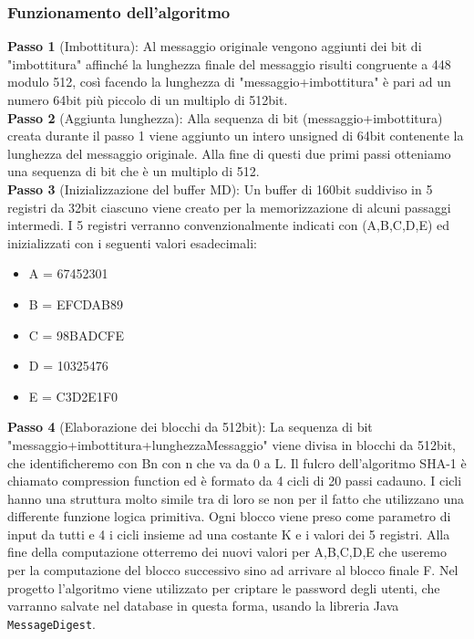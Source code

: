 \documentclass[12pt,a4]{article}
\begin{document}
\subsubsection{Funzionamento dell'algoritmo}

\textbf{Passo 1} (Imbottitura): Al messaggio originale vengono aggiunti dei bit di "imbottitura" affinché la lunghezza finale del messaggio risulti congruente a 448 modulo 512, così facendo la lunghezza di "messaggio+imbottitura" è pari ad un numero 64bit più piccolo di un multiplo di 512bit.\\
\textbf{Passo 2} (Aggiunta lunghezza): Alla sequenza di bit (messaggio+imbottitura) creata durante il passo 1 viene aggiunto un intero unsigned di 64bit contenente la lunghezza del messaggio originale. Alla fine di questi due primi passi otteniamo una sequenza di bit che è un multiplo di 512.\\
\textbf{Passo 3} (Inizializzazione del buffer MD): Un buffer di 160bit suddiviso in 5 registri da 32bit ciascuno viene creato per la memorizzazione di alcuni passaggi intermedi. I 5 registri verranno convenzionalmente indicati con (A,B,C,D,E) ed inizializzati con i seguenti valori esadecimali:
\begin{itemize}

\item A = 67452301
\item B = EFCDAB89
\item C = 98BADCFE
\item D = 10325476
\item E = C3D2E1F0

\end{itemize}
\textbf{Passo 4} (Elaborazione dei blocchi da 512bit): La sequenza di bit "messaggio+imbottitura+lunghezzaMessaggio" viene divisa in blocchi da 512bit, che identificheremo con Bn con n che va da 0 a L. Il fulcro dell'algoritmo SHA-1 è chiamato compression function ed è formato da 4 cicli di 20 passi cadauno. I cicli hanno una struttura molto simile tra di loro se non per il fatto che utilizzano una differente funzione logica primitiva. Ogni blocco viene preso come parametro di input da tutti e 4 i cicli insieme ad una costante K e i valori dei 5 registri. Alla fine della computazione otterremo dei nuovi valori per A,B,C,D,E che useremo per la computazione del blocco successivo sino ad arrivare al blocco finale F.
Nel progetto l'algoritmo viene utilizzato per criptare le password degli utenti, che varranno salvate nel database in questa forma, usando la libreria Java \texttt{MessageDigest}.\\
\end{document}
